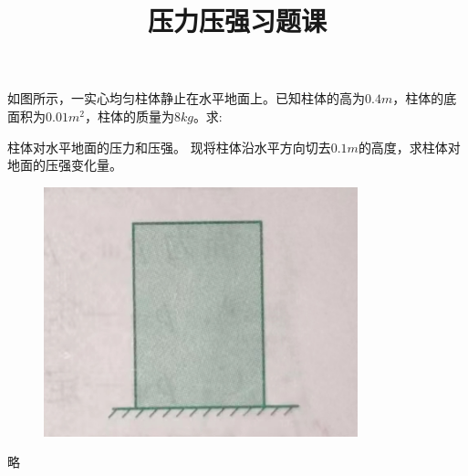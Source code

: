 \documentclass[a4paper,cs4size]{BHCexam}
\title{压力压强习题课}
\begin{document}
\maketitle
\begin{groups}
    \group{}{}
    \begin{questions}[]

        \question[5] 如图所示，一实心均匀柱体静止在水平地面上。已知柱体的高为$0.4m$，柱体的底面积为$0.01m^2$，柱体的质量为$8kg$。求:
        \begin{subquestions}
            \subquestion 柱体对水平地面的压力和压强。
            \subquestion 现将柱体沿水平方向切去$0.1m$的高度，求柱体对地面的压强变化量。
        \end{subquestions}
        \begin{figure}[htb]
            \flushright
            \includegraphics [scale=0.4,trim=0 0 0 0]{./image/physics_pressure_1.png}
            \label{fig:fig_pressure_1}
        \end{figure}
        \begin{solution}{0.5cm}
            \methodonly 略
        \end{solution}
        \vspace{5cm}


\end{questions}
\end{groups}
\end{document}
